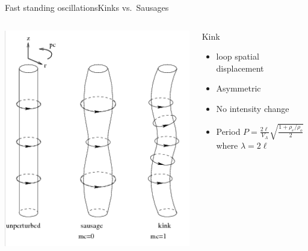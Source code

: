 \documentclass[11pt,table]{beamer}
\begin{document}
\begin{frame}{Fast standing oscillations}{Kinks vs.\ Sausages}
    \begin{columns}
            \includegraphics[width=\textwidth]{kink_saus.png}
        \column{0.5\paperwidth}
        \vspace{-0.5in}
        \begin{block}{Kink}
            \begin{itemize}
                \item loop spatial displacement
                \item Asymmetric
                \item No intensity change
                \item Period $P=\frac{2\ell}{V_A}
                    \sqrt{\frac{1+\rho_e/\rho_o}{2}}$\\
                    where $\lambda=2\ell$
            \end{itemize}
        \end{block}

\end{columns}
\end{frame}
\end{document}

